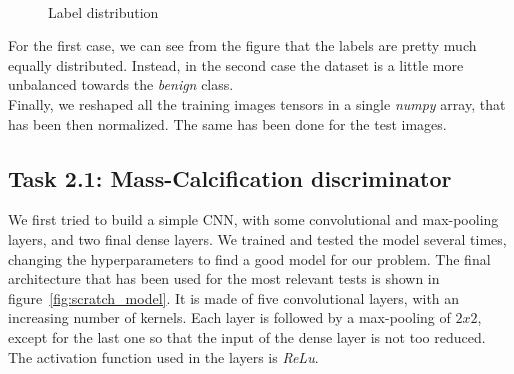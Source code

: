 \documentclass[11pt,a4paper,oneside]{article}
\begin{document}
\begin{figure}[h]
\centering
	 \quad
	 \\
\caption{Label distribution}
\label{fig:label distribution}
\end{figure}

For the first case, we can see from the figure that the labels are pretty much equally distributed. Instead, in the second case the dataset is a little more unbalanced towards the \textit{benign} class. \\
Finally, we reshaped all the training images tensors in a single \textit{numpy} array, that has been then normalized. The same has been done for the test images. 

\subsection{Task 2.1: Mass-Calcification discriminator}
We first tried to build a simple CNN, with some convolutional and max-pooling layers, and two final dense layers. We trained and tested the model several times, changing the hyperparameters to find a good model for our problem. The final architecture that has been used for the most relevant tests is shown in figure~\ref{fig:scratch_model}. It is made of five convolutional layers, with an increasing number of kernels. Each layer is followed by a max-pooling of $2x2$, except for the last one so that the input of the dense layer is not too reduced. The activation function used in the layers is \textit{ReLu}.
\end{document}
